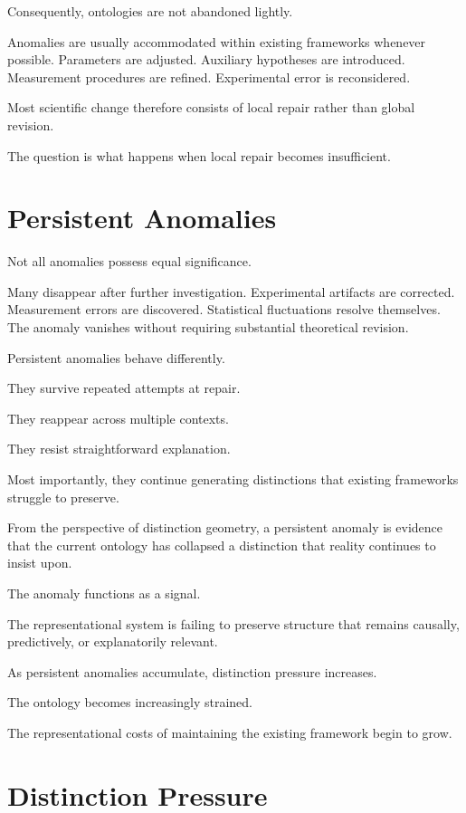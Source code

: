 \documentclass[11pt,oneside,openany]{book}
\begin{document}
Consequently, ontologies are not abandoned lightly.

Anomalies are usually accommodated within existing frameworks whenever possible. Parameters are adjusted. Auxiliary hypotheses are introduced. Measurement procedures are refined. Experimental error is reconsidered.

Most scientific change therefore consists of local repair rather than global revision.

The question is what happens when local repair becomes insufficient.

\section{Persistent Anomalies}

Not all anomalies possess equal significance.

Many disappear after further investigation. Experimental artifacts are corrected. Measurement errors are discovered. Statistical fluctuations resolve themselves. The anomaly vanishes without requiring substantial theoretical revision.

Persistent anomalies behave differently.

They survive repeated attempts at repair.

They reappear across multiple contexts.

They resist straightforward explanation.

Most importantly, they continue generating distinctions that existing frameworks struggle to preserve.

From the perspective of distinction geometry, a persistent anomaly is evidence that the current ontology has collapsed a distinction that reality continues to insist upon.

The anomaly functions as a signal.

The representational system is failing to preserve structure that remains causally, predictively, or explanatorily relevant.

As persistent anomalies accumulate, distinction pressure increases.

The ontology becomes increasingly strained.

The representational costs of maintaining the existing framework begin to grow.

\section{Distinction Pressure}
\end{document}
